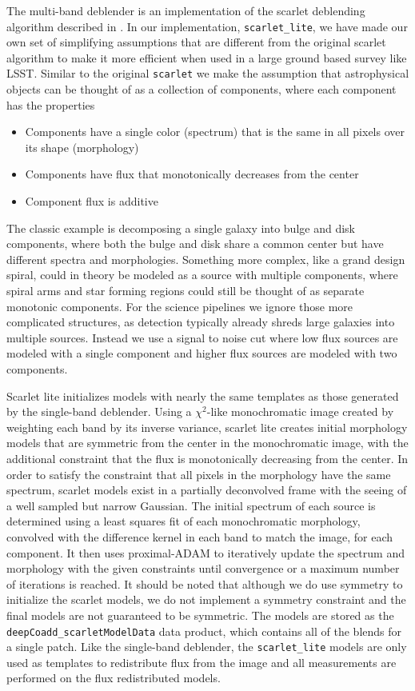 The multi-band deblender is an implementation of the scarlet deblending algorithm described in \citet{2018A&C....24..129M}.
In our implementation, \texttt{scarlet\_lite}, we have made our own set of simplifying assumptions that are different from the original scarlet algorithm to make it more efficient when used in a large ground based survey like LSST.
Similar to the original \texttt{scarlet} we make the assumption that astrophysical objects can be thought of as a collection of components, where each component has the properties
\begin{itemize}
    \item Components have a single color (spectrum) that is the same in all pixels over its shape (morphology)
    \item Components have flux that monotonically decreases from the center
    \item Component flux is additive
\end{itemize}

The classic example is decomposing a single galaxy into bulge and disk components, where both the bulge and disk share a common center but have different spectra and morphologies.
Something more complex, like a grand design spiral, could in theory be modeled as a source with multiple components, where spiral arms and star forming regions could still be thought of as separate monotonic components.
For the science pipelines we ignore those more complicated structures, as detection typically already shreds large galaxies into multiple sources.
Instead we use a signal to noise cut where low flux sources are modeled with a single component and higher flux sources are modeled with two components.

Scarlet lite initializes models with nearly the same templates as those generated by the single-band deblender.
Using a $\chi^2$-like monochromatic image created by weighting each band by its inverse variance, scarlet lite creates initial morphology models that are symmetric from the center in the monochromatic image, with the additional constraint that the flux is monotonically decreasing from the center.
In order to satisfy the constraint that all pixels in the morphology have the same spectrum, scarlet models exist in a partially deconvolved frame with the seeing of a well sampled but narrow Gaussian.
The initial spectrum of each source is determined using a least squares fit of each monochromatic morphology, convolved with the difference kernel in each band to match the image, for each component.
It then uses proximal-ADAM \citep[PADAM,][]{2019arXiv191010094M} to iteratively update the spectrum and morphology with the given constraints until convergence or a maximum number of iterations is reached.
It should be noted that although we do use symmetry to initialize the scarlet models, we do not implement a symmetry constraint and the final models are not guaranteed to be symmetric.
The models are stored as the \texttt{deepCoadd\_scarletModelData} data product, which contains all of the blends for a single patch.
Like the single-band deblender, the \texttt{scarlet\_lite} models are only used as templates to redistribute flux from the image and all measurements are performed on the flux redistributed models.
